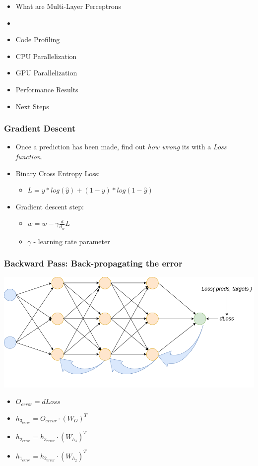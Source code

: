 \begin{frame}
\begin{itemize}
    \item What are Multi-Layer Perceptrons
    \item \textbf{\color{red}{Gradient Descent}}
    \item Code Profiling
    \item CPU Parallelization
    \item GPU Parallelization
    \item Performance Results 
    \item Next Steps
\end{itemize}
\end{frame}

\begin{frame}
    \frametitle{Gradient Descent}
    \begin{itemize}
        \item Once a prediction has been made, find out \textit{how wrong} its with a \textit{Loss function.} 
        \item Binary Cross Entropy Loss:
        \begin{itemize}
            \item $L = y * log(\hat{y}) + (1 - y) * log(1 - \hat{y})$
        \end{itemize}
        \item Gradient descent step:
        \begin{itemize}
            \item $w = w - \gamma \frac{d}{d_w}L$
            \item $\gamma$ - learning rate parameter
        \end{itemize}
        
    \end{itemize}
    
\end{frame}

\begin{frame}
    \frametitle{Backward Pass: Back-propagating the error}
    \center\includegraphics[width=.8\textwidth]{Images/backprop.png}
    \begin{itemize}
        \item $O_{error} = dLoss$
        \item $h_{3_{error}} = O_{error} \cdot (W_{O})^T$
        \item $h_{2_{error}} = h_{3_{error}} \cdot (W_{h_3})^T$
        \item $h_{1_{error}} = h_{2_{error}} \cdot (W_{h_2})^T$
    \end{itemize}
\end{frame}

